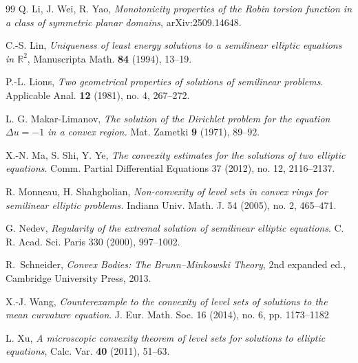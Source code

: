 \documentclass[reqno,12pt]{amsart}
\numberwithin{equation}{section}
\theoremstyle{remark}
\begin{document}
\begin{thebibliography}{99}
Q. Li, J. Wei, R. Yao, \emph{Monotonicity properties of the Robin torsion function in a class of symmetric planar domains}, arXiv:2509.14648.


C.-S. Lin, \emph{Uniqueness of least energy solutions to a semilinear elliptic equations in $\mathbb R^2$}, Manuscripta Math. \textbf{84}
(1994), 13--19.


P.-L. Lions, \emph{Two geometrical properties of solutions of semilinear problems}.
Applicable Anal. \textbf{12} (1981), no. 4, 267--272.

L. G. Makar-Limanov, 
\emph{The solution of the Dirichlet problem for the equation $\Delta u=-1$ in a convex region. }
Mat. Zametki \textbf{9} (1971), 89--92.


X.-N. Ma, S. Shi, Y. Ye, \emph{The convexity estimates for the solutions of two elliptic equations}. Comm. Partial Differential Equations 37 (2012), no. 12, 2116--2137. 

R. Monneau,  H. Shahgholian, 
\emph{Non-convexity of level sets in convex rings for semilinear elliptic problems.}
Indiana Univ. Math. J. 54 (2005), no. 2, 465--471.

G. Nedev, \emph{Regularity of the extremal solution of semilinear elliptic equations}. C. R. Acad. Sci. Paris
330 (2000), 997--1002.

R.~Schneider,
 \emph{Convex Bodies: The Brunn--Minkowski Theory},
 2nd expanded ed., Cambridge University Press, 2013.

X.-J. Wang, \emph{Counterexample to the convexity of level sets of solutions to the mean curvature equation}. J. Eur. Math. Soc. 16 (2014), no. 6, pp. 1173--1182

L. Xu, \emph{A microscopic convexity theorem of level sets for solutions to elliptic equations}, Calc. Var. \textbf{40} (2011), 51--63.

\end{thebibliography}
\end{document}

